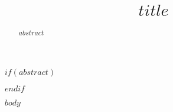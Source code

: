 \documentclass[11pt,a4paper]{style/ivoa}
\title{$title$}
\author$if(author.url)$[$author.url$]$endif${$author.name$}
\begin{document}
$if(abstract)$
\begin{abstract}
$abstract$
\end{abstract}
$endif$

$body$
\end{document}
